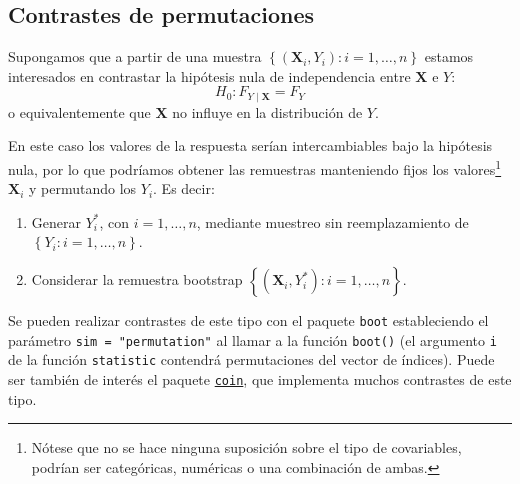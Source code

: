\documentclass[
  10pt,
]{book}
\renewcommand{\mathbf}[1]{\symbf{#1}}
\theoremstyle{break}
\theoremstyle{nonumberplain}
\let\oldfootnote\footnote
\renewcommand\footnote[1]{\oldfootnote{\hspace{2mm}#1}}
\begin{document}
\hypertarget{contrastes-de-permutaciones}{%
\subsection{Contrastes de permutaciones}\label{contrastes-de-permutaciones}}

Supongamos que a partir de una muestra
\(\left\{ \left( \mathbf{X}_i, Y_i\right): i=1,\ldots, n \right\}\)
estamos interesados en contrastar la hipótesis nula de independencia
entre \(\mathbf{X}\) e \(Y\):
\[H_0: F_{Y \mid \mathbf{X}} = F_Y\]
o equivalentemente que \(\mathbf{X}\) no influye en la distribución de \(Y\).

En este caso los valores de la respuesta serían intercambiables bajo la hipótesis nula,
por lo que podríamos obtener las remuestras manteniendo fijos los valores\footnote{Nótese que
  no se hace ninguna suposición sobre el tipo de covariables,
  podrían ser categóricas, numéricas o una combinación de ambas.}
\(\mathbf{X}_i\) y permutando los \(Y_i\). Es decir:

\begin{enumerate}
\def\labelenumi{\arabic{enumi}.}
\item
  Generar \(Y^{\ast}_i\), con \(i=1,\ldots, n\), mediante muestreo
  sin reemplazamiento de \(\left\{ Y_i: i=1,\ldots, n \right\}\).
\item
  Considerar la remuestra bootstrap
  \(\left\{ \left( \mathbf{X}_i, Y^{\ast}_i\right): i=1,\ldots, n \right\}\).
\end{enumerate}

Se pueden realizar contrastes de este tipo con el paquete \texttt{boot} estableciendo
el parámetro \texttt{sim\ =\ "permutation"} al llamar a la función \texttt{boot()} (el argumento
\texttt{i} de la función \texttt{statistic} contendrá permutaciones del vector de índices).
Puede ser también de interés el paquete \href{https://cran.r-project.org/web/packages/coin/index.html}{\texttt{coin}},
que implementa muchos contrastes de este tipo.
\end{document}
